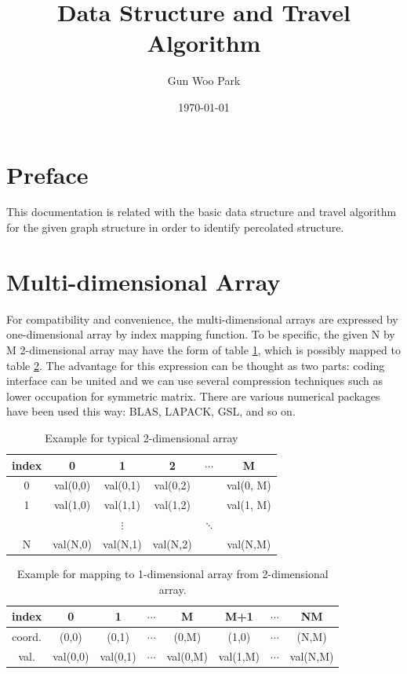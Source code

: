 \documentclass[11pt]{article}
\author{Gun Woo Park}
\date{\today}
\title{Data Structure and Travel Algorithm}
\begin{document}
\maketitle
\tableofcontents


\section{Preface}
\label{sec:orgheadline1}
This documentation is related with the basic data structure and travel algorithm for the given graph structure in order to identify percolated structure. 

\section{Multi-dimensional Array}
\label{sec:orgheadline2}
For compatibility and convenience, the multi-dimensional arrays are expressed by one-dimensional array by index mapping function. To be specific, the given N by M 2-dimensional array may have the form of table \ref{tab:orgtable1}, which is possibly mapped to table \ref{tab:orgtable2}. The advantage for this expression can be thought as two parts: coding interface can be united and we can use several compression techniques such as lower occupation for symmetric matrix. There are various numerical packages have been used this way: BLAS, LAPACK, GSL, and so on.


\begin{table}[htb]
\caption{\label{tab:orgtable1}
Example for typical 2-dimensional array}
\centering
\begin{tabular}{cccccc}
index & 0 & 1 & 2 & \(\cdots\) & M\\
\hline
0 & val(0,0) & val(0,1) & val(0,2) &  & val(0, M)\\
1 & val(1,0) & val(1,1) & val(1,2) &  & val(1, M)\\
 &  & \(\vdots\) &  & \(\ddots\) & \\
N & val(N,0) & val(N,1) & val(N,2) &  & val(N,M)\\
\end{tabular}
\end{table}

\begin{table}[htb]
\caption{\label{tab:orgtable2}
Example for mapping to 1-dimensional array from 2-dimensional array.}
\centering
\begin{tabular}{cccccccc}
index & 0 & 1 & \(\cdots\) & M & M+1 & \(\cdots\) & NM\\
\hline
coord. & (0,0) & (0,1) & \(\cdots\) & (0,M) & (1,0) & \(\cdots\) & (N,M)\\
\hline
val. & val(0,0) & val(0,1) & \(\cdots\) & val(0,M) & val(1,M) & \(\cdots\) & val(N,M)\\
\end{tabular}
\end{table}
\end{document}
